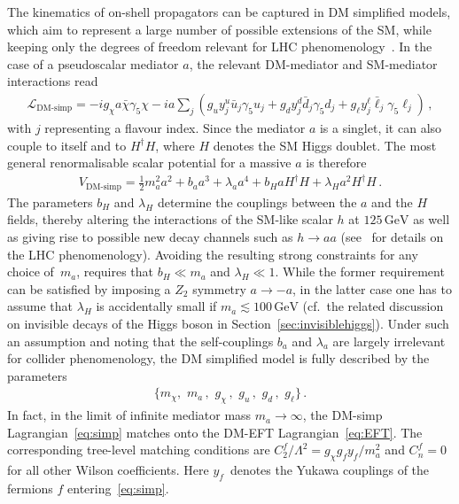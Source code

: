 \documentclass[review]{elsarticle}
\begin{document}
The kinematics of on-shell propagators can be captured in DM simplified models, which aim to represent a large number of possible extensions of the SM, while keeping only the degrees of freedom relevant for LHC phenomenology~\cite{Abdallah:2015ter,Abercrombie:2015wmb}. In the case of a pseudoscalar mediator $a$, the relevant DM-mediator and SM-mediator interactions read
\begin{align}\label{eq:simp}
\mathcal{L}_\text{DM-simp}=-i g_\chi a\bar \chi \gamma_5 \chi -i a \sum_j \left(g_u y_j^u \bar u_j \gamma_5 u_j + g_d y_j^d \bar d_j \gamma_5 d_j + g_\ell y_j^\ell \bar \ell_j\gamma_5 \ell_j  \right) \,,
\end{align}
with  $j$ representing a flavour index.  Since the mediator $a$ is a singlet, it can also couple to itself and to $H^\dagger H$, where $H$ denotes  the SM Higgs doublet. The most general renormalisable scalar potential for a massive $a$ is therefore
\begin{align}\label{eq:VaH}
V_\text{DM-simp} =\frac{1}{2}m_a^2 a^2 +  b_a a^3 + \lambda_a a^4 + b_{H} a H^\dagger H +\lambda_{H} a^2H^\dagger H \,.
\end{align}
The parameters $ b_{H}$  and $\lambda_{H}$ determine the couplings between the $a$ and the $H$ fields, thereby altering  the interactions  of the SM-like scalar $h$ at $125 \, {\mathrm{GeV}}$ as well as giving rise to possible new decay channels such as $h \to aa$ (see~\cite{Curtin:2013fra,Haisch:2018kqx} for details on the LHC phenomenology). Avoiding the resulting strong constraints for any choice of~$m_a$, requires that  $b_H \ll m_a $ and $\lambda_H \ll 1$. While the former requirement can be satisfied by imposing a $Z_2$ symmetry $a \to -a$, in the latter case one has to assume that $\lambda_H$ is accidentally small if $m_a 
\lesssim 100 \, 
\mathrm{GeV}$ (cf.~the related discussion on invisible decays of the Higgs boson in Section~\ref{sec:invisiblehiggs}). Under such an assumption and noting that the self-couplings $b_a$ and $\lambda_a$ are largely irrelevant for collider phenomenology, the DM simplified model is  fully described by the parameters 
\begin{align}
\big\{ m_\chi, \,\, m_a\,,\,\, g_\chi\,, \,\, g_u\,,\,\,g_d\,,\,\, g_\ell \big\}\,. 
\end{align}
In fact, in the  limit of infinite mediator mass $m_a \to \infty$,  the DM-simp Lagrangian~\eqref{eq:simp} matches onto the DM-EFT Lagrangian~\eqref{eq:EFT}. The corresponding tree-level matching conditions are $C^f_2/\Lambda^2 = g_\chi g_f y_f  /m_a^2$ and $C_n^f=0$ for all other Wilson coefficients. Here $y_f$~denotes the Yukawa couplings of the fermions $f$ entering~\eqref{eq:simp}.
\end{document}
